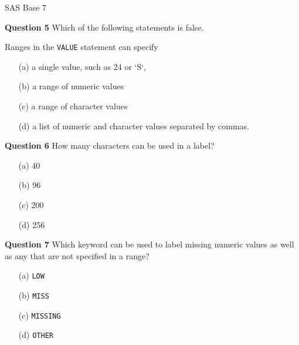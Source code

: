 
SAS Base 7

\textbf{Question 5}
Which of the following statements is false.

Ranges in the \texttt{VALUE} statement can specify

\begin{itemize}
\item[(a)] a single value, such as 24 or `S`,
\item[(b)] a range of numeric values
\item[(c)] a range of character values
\item[(d)] a list of numeric and character values separated by commas.
\end{itemize}



\textbf{Question 6}
How many characters can be used in a label?

\begin{itemize}
\item[(a)] 40
\item[(b)] 96
\item[(c)] 200
\item[(d)] 256
\end{itemize}

\textbf{Question 7}
Which keyword can be used to label missing numeric values as well as any
that are not specified in a range?

\begin{itemize}
\item[(a)] \texttt{LOW}
\item[(b)] \texttt{MISS}
\item[(c)] \texttt{MISSING}
\item[(d)] \texttt{OTHER}
\end{itemize}

